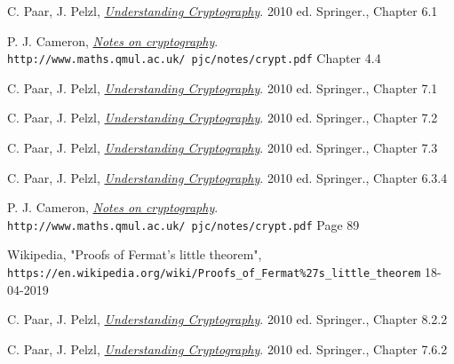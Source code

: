 \documentclass{article}
\begin{document}
	\begin{thebibliography}{99}
		
		C. Paar, J. Pelzl, 
		\textit{\underline{Understanding Cryptography}}. 2010 ed.
		Springer., Chapter 6.1 
		
		P. J. Cameron, 
		\textit{\underline{Notes on cryptography}}.
		\\\texttt{http://www.maths.qmul.ac.uk/~pjc/notes/crypt.pdf}
		Chapter 4.4 
		
		C. Paar, J. Pelzl, 
		\textit{\underline{Understanding Cryptography}}. 2010 ed.
		Springer., Chapter 7.1 
		
		C. Paar, J. Pelzl, 
		\textit{\underline{Understanding Cryptography}}. 2010 ed.
		Springer., Chapter 7.2
		
		C. Paar, J. Pelzl, 
		\textit{\underline{Understanding Cryptography}}. 2010 ed.
		Springer., Chapter 7.3 
		
		C. Paar, J. Pelzl, 
		\textit{\underline{Understanding Cryptography}}. 2010 ed.
		Springer., Chapter 6.3.4 
		
		P. J. Cameron, 
		\textit{\underline{Notes on cryptography}}.
		\\\texttt{http://www.maths.qmul.ac.uk/~pjc/notes/crypt.pdf}
		Page 89  
		
		Wikipedia, "Proofs of Fermat's little theorem",
		\\\texttt{https://en.wikipedia.org/wiki/Proofs\_of\_Fermat\%27s\_little\_theorem} 18-04-2019
		
		C. Paar, J. Pelzl, 
		\textit{\underline{Understanding Cryptography}}. 2010 ed.
		Springer., Chapter 8.2.2 
		
		C. Paar, J. Pelzl, 
		\textit{\underline{Understanding Cryptography}}. 2010 ed.
		Springer., Chapter 7.6.2
		
		
	\end{thebibliography}
\end{document}
